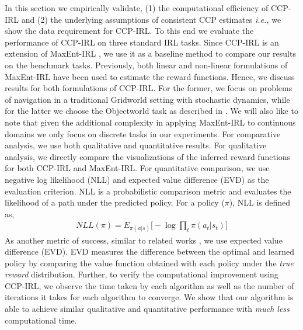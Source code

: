 \documentclass{article}
\begin{document}
In this section we empirically validate,
(1) the computational efficiency of CCP-IRL and (2) the underlying assumptions of consistent CCP estimates \emph{i.e.,} we show the data requirement for CCP-IRL.
To this end we evaluate the performance of CCP-IRL on three standard IRL tasks. Since CCP-IRL is an extension of MaxEnt-IRL \cite{ziebart}, we use it as a baseline method to compare our results on the benchmark tasks. Previously, both linear \cite{ziebart} \cite{ziebart2010modeling} and non-linear \cite{wulfmeier2015maximum} formulations of MaxEnt-IRL have been used to estimate the reward functions. Hence, we discuss results for both formulations of CCP-IRL. For the former, we focus on problems of navigation in a traditional Gridworld setting with stochastic dynamics, while for the latter we choose the Objectworld task as described in \cite{Levine2013}. We will also like to note that given the additional complexity in applying MaxEnt-IRL to continuous domains we only focus on discrete tasks in our experiments.
For comparative analysis, we use both qualitative and quantitative results.
For qualitative analysis, we directly compare the visualizations of the inferred reward functions for both CCP-IRL and MaxEnt-IRL.
For quantitative comparison, we use negative log likelihood (NLL) \cite{kitani2012activity} and expected value difference (EVD) \cite{levine2011nonlinear} as the evaluation criterion. NLL is a probabilistic comparison metric and evaluates the likelihood of a path under the predicted policy. For a policy ($\pi$), NLL is defined as,
\begin{align}
NLL(\pi) = E_{\pi(a|s)}\big[-\log \prod_{t} \pi(a_{t}|s_{t}) \big]
\end{align}
As another metric of success, similar to related works \cite{Levine2013, wulfmeier2015maximum}, we use expected value difference (EVD). EVD measures the difference between the optimal and learned policy by comparing the value function obtained with each policy under the \textit{true reward} distribution.
Further, to verify the computational improvement using CCP-IRL, we observe the time taken by each algorithm as well as the number of iterations it takes for each algorithm to converge. We show that our algorithm is able to achieve similar qualitative and quantitative performance with \textit{much less} computational time.
\end{document}
